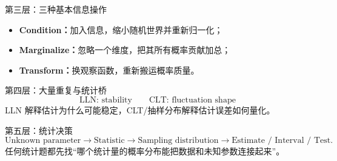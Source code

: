 \documentclass[11pt,a4paper,openany]{ctexbook}
\newcommand{\key}[1]{\textbf{\color{deep}#1}}
\begin{document}
\begin{corebox}{第三层：三种基本信息操作}
\begin{itemize}
  \item \key{Condition：}加入信息，缩小随机世界并重新归一化；
  \item \key{Marginalize：}忽略一个维度，把其所有概率贡献加总；
  \item \key{Transform：}换观察函数，重新搬运概率质量。
\end{itemize}
\end{corebox}

\begin{corebox}{第四层：大量重复与统计桥}
\[
\boxed{\text{LLN: stability}\qquad\text{CLT: fluctuation shape}}
\]
LLN 解释估计为什么可能稳定，CLT/抽样分布解释估计误差如何量化。
\end{corebox}

\begin{corebox}{第五层：统计决策}
\[
\boxed{\text{Unknown parameter}\to\text{Statistic}\to\text{Sampling distribution}\to\text{Estimate / Interval / Test}.}
\]
任何统计题都先找“哪个统计量的概率分布能把数据和未知参数连接起来”。
\end{corebox}
\end{document}
